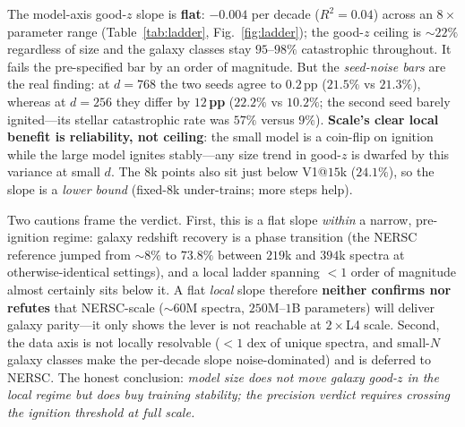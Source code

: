 \documentclass[11pt,letterpaper]{article}
\begin{document}
The model-axis good-$z$ slope is \textbf{flat}: $-0.004$ per decade
($R^2{=}0.04$) across an $8{\times}$ parameter range (Table~\ref{tab:ladder},
Fig.~\ref{fig:ladder}); the good-$z$ ceiling is ${\sim}22\%$ regardless of size
and the galaxy classes stay $95$--$98\%$ catastrophic throughout. It fails the
pre-specified bar by an order of magnitude. But the \emph{seed-noise bars} are
the real finding: at $d{=}768$ the two seeds agree to $0.2$\,pp ($21.5\%$ vs
$21.3\%$), whereas at $d{=}256$ they differ by \textbf{$12$\,pp} ($22.2\%$ vs
$10.2\%$; the second seed barely ignited---its stellar catastrophic rate was
$57\%$ versus $9\%$). \textbf{Scale's clear local benefit is reliability, not
ceiling}: the small model is a coin-flip on ignition while the large model
ignites stably---any size trend in good-$z$ is dwarfed by this variance at small
$d$. The $8$k points also sit just below V1@$15$k ($24.1\%$), so the slope is a
\emph{lower bound} (fixed-$8$k under-trains; more steps help).

Two cautions frame the verdict. First, this is a flat slope \emph{within} a
narrow, pre-ignition regime: galaxy redshift recovery is a phase transition (the
NERSC reference jumped from ${\sim}8\%$ to $73.8\%$ between $219$k and $394$k
spectra at otherwise-identical settings), and a local ladder spanning $<\!1$
order of magnitude almost certainly sits below it. A flat \emph{local} slope
therefore \textbf{neither confirms nor refutes} that NERSC-scale (${\sim}60$M
spectra, $250$M--$1$B parameters) will deliver galaxy parity---it only shows the
lever is not reachable at $2{\times}$L4 scale. Second, the data axis is not
locally resolvable ($<\!1$ dex of unique spectra, and small-$N$ galaxy classes
make the per-decade slope noise-dominated) and is deferred to NERSC. The honest
conclusion: \emph{model size does not move galaxy good-$z$ in the local regime
but does buy training stability; the precision verdict requires crossing the
ignition threshold at full scale.}
\end{document}
